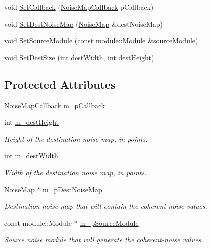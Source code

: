\begin{DoxyCompactItemize}
\item 
void \hyperlink{classnoise_1_1utils_1_1_noise_map_builder_a901f165227e6095b57342698e0c682e5}{Set\+Callback} (\hyperlink{namespacenoise_1_1utils_af10741a3394fadf8798a8f40b753b208}{Noise\+Map\+Callback} p\+Callback)
\item 
void \hyperlink{classnoise_1_1utils_1_1_noise_map_builder_a07555b64324efbb16f0ef244c4fed8b7}{Set\+Dest\+Noise\+Map} (\hyperlink{classnoise_1_1utils_1_1_noise_map}{Noise\+Map} \&dest\+Noise\+Map)
\item 
void \hyperlink{classnoise_1_1utils_1_1_noise_map_builder_aa39e8ea292711aa3a7627ddcaee4f12f}{Set\+Source\+Module} (const module\+::\+Module \&source\+Module)
\item 
void \hyperlink{classnoise_1_1utils_1_1_noise_map_builder_abad282f0cbe67824b73c580f611a7bd0}{Set\+Dest\+Size} (int dest\+Width, int dest\+Height)
\end{DoxyCompactItemize}
\subsection*{Protected Attributes}
\begin{DoxyCompactItemize}
\item 
\hyperlink{namespacenoise_1_1utils_af10741a3394fadf8798a8f40b753b208}{Noise\+Map\+Callback} \hyperlink{classnoise_1_1utils_1_1_noise_map_builder_adf2a8d0f463ba83c0efabffc83b0074c}{m\+\_\+p\+Callback}
\item 
int \hyperlink{classnoise_1_1utils_1_1_noise_map_builder_a06a6db4772fe959e741be9ebe2023ce8}{m\+\_\+dest\+Height}
\begin{DoxyCompactList}\small\item\em Height of the destination noise map, in points. \end{DoxyCompactList}\item 
int \hyperlink{classnoise_1_1utils_1_1_noise_map_builder_a95d8075e9917c2a1c319a0afe639dd31}{m\+\_\+dest\+Width}
\begin{DoxyCompactList}\small\item\em Width of the destination noise map, in points. \end{DoxyCompactList}\item 
\hyperlink{classnoise_1_1utils_1_1_noise_map}{Noise\+Map} $\ast$ \hyperlink{classnoise_1_1utils_1_1_noise_map_builder_a6de6a3c7781f2823b10057d6a657b631}{m\+\_\+p\+Dest\+Noise\+Map}
\begin{DoxyCompactList}\small\item\em Destination noise map that will contain the coherent-\/noise values. \end{DoxyCompactList}\item 
const module\+::\+Module $\ast$ \hyperlink{classnoise_1_1utils_1_1_noise_map_builder_a45b357c74061bc078bc800605c3c1636}{m\+\_\+p\+Source\+Module}
\begin{DoxyCompactList}\small\item\em Source noise module that will generate the coherent-\/noise values. \end{DoxyCompactList}\end{DoxyCompactItemize}


